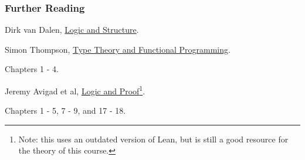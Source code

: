 \documentclass{beamer}
\begin{document}
\begin{frame}
	\frametitle{Further Reading}

	Dirk van Dalen, \href{https://libcat.canterbury.ac.nz/Record/112862}{Logic and Structure}. 

	\vspace{10mm}

	Simon Thompson, \href{https://www.cs.cornell.edu/courses/cs6110/2015sp/textbook/Simon\%20Thompson\%20textbook.pdf}{Type Theory and Functional Programming}. 
	
	Chapters 1 - 4. 

	\vspace{10mm}

	Jeremy Avigad et al, \href{https://leanprover.github.io/logic_and_proof_lean3/index.html}{Logic and Proof}\footnote{Note: this uses an outdated version of Lean, but is still a good resource for the theory of this course.}. 
	
	Chapters 1 - 5, 7 - 9, and 17 - 18.
\end{frame}
\end{document}
